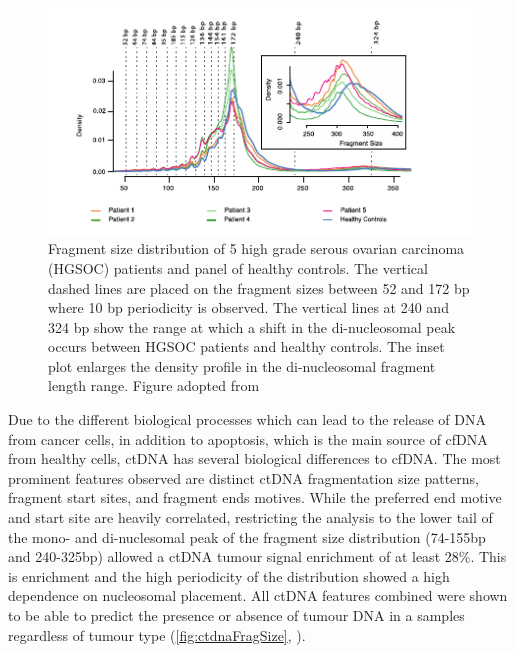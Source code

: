 \begin{figure}[hbt]
\centering
\includegraphics[width=0.9\linewidth]{Figures/intro/fragmentSizeDist}
\caption[Fragment size distribution of ctDNA]{Fragment size distribution of 5 high grade serous
ovarian carcinoma (HGSOC) patients and panel of healthy controls. The vertical dashed lines are placed on the fragment sizes between 52 and 172 bp where 10 bp periodicity is observed. The vertical lines at 240 and 324 bp show the range at which a shift in the di-nucleosomal peak occurs between HGSOC patients and healthy controls. The inset plot enlarges the density profile in the di-nucleosomal fragment length range. Figure adopted from \textcite{Markus2022}}\label{fig:ctdnaFragSize}
\end{figure}

Due to the different biological processes which can lead to the release of DNA from cancer cells, in addition to apoptosis, which is the main source of cfDNA from healthy cells, ctDNA has several biological differences to cfDNA. The most prominent features observed are distinct ctDNA fragmentation size patterns, fragment start sites, and fragment ends motives. While the preferred end motive and start site are heavily correlated, restricting the analysis to the lower tail of the mono- and di-nuclesomal peak of the fragment size distribution (74-155bp and 240-325bp) allowed a ctDNA tumour signal enrichment of at least 28\%. This is enrichment and the high periodicity of the distribution showed a high dependence on nucleosomal placement. All ctDNA features combined were shown to be able to predict the presence or absence of tumour DNA in a samples regardless of tumour type  (\autoref{fig:ctdnaFragSize}, \cite{Mouliere2018,Markus2022}). 
